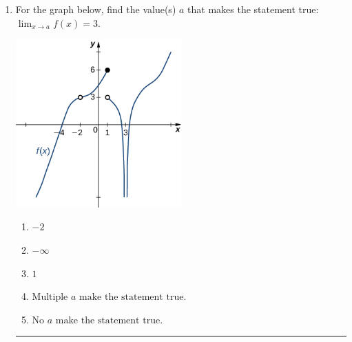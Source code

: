 \documentclass[14pt]{extbook}
\newcommand{\litem}[1]{\item#1\hspace*{-1cm}\rule{\textwidth}{0.4pt}}
\begin{document}
\begin{enumerate}
{\begin{enumerate}[label=\Alph*.]
\end{enumerate} }
\litem{
For the graph below, find the value(s) $a$ that makes the statement true: $ \displaystyle \lim_{x \rightarrow a} f(x) = 3$.
\begin{center}
    \includegraphics[width=0.5\textwidth]{../Figures/evaluateLimitGraphicallyCopyB.png}
\end{center}
\begin{enumerate}[label=\Alph*.]
\item \( -2 \)
\item \( -\infty \)
\item \( 1 \)
\item \( \text{Multiple } a \text{ make the statement true}. \)
\item \( \text{No } a \text{ make the statement true}. \)

\end{enumerate} }
\end{enumerate}
\end{document}
